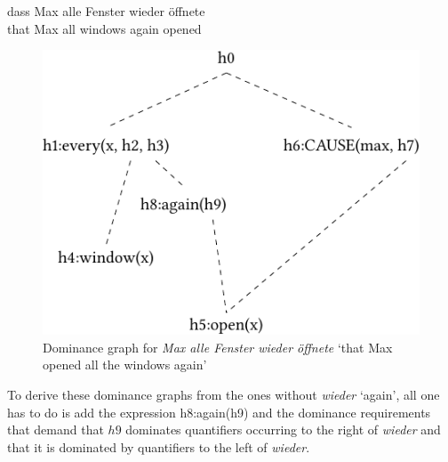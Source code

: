 \gll dass Max alle Fenster wieder öffnete\\
	 that Max all windows again opened\\
\z
\begin{figure}
\centering
\includegraphics{Figures/mrs-max-alle-fenster-wieder-oeffnete-cropped.pdf}
\caption{Dominance graph for \emph{Max alle Fenster wieder öffnete} `that Max opened all the
  windows again'\label{Abbildung-Max-alle-Fenster-wieder-oeffnete}}
\end{figure}%
To derive these dominance graphs from the ones without \emph{wieder} `again', all one has to do is add the expression h8:again(h9)
and the dominance requirements that demand that $h9$ dominates quantifiers occurring to the right of \emph{wieder} and that it
is dominated by quantifiers to the left of \emph{wieder}.

